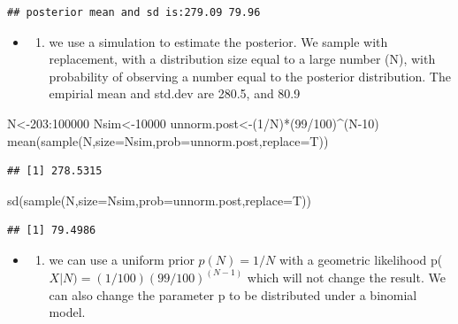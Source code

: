 \documentclass[
]{book}
\newenvironment{Shaded}{\begin{snugshade}}{\end{snugshade}}
\newcommand{\AttributeTok}[1]{\textcolor[rgb]{0.77,0.63,0.00}{#1}}
\newcommand{\DecValTok}[1]{\textcolor[rgb]{0.00,0.00,0.81}{#1}}
\newcommand{\FunctionTok}[1]{\textcolor[rgb]{0.00,0.00,0.00}{#1}}
\newcommand{\NormalTok}[1]{#1}
\newcommand{\OtherTok}[1]{\textcolor[rgb]{0.56,0.35,0.01}{#1}}
\newcommand{\SpecialCharTok}[1]{\textcolor[rgb]{0.00,0.00,0.00}{#1}}
\providecommand{\tightlist}{%
  \setlength{\itemsep}{0pt}\setlength{\parskip}{0pt}}
\theoremstyle{definition}
\theoremstyle{definition}
\theoremstyle{definition}
\theoremstyle{definition}
\theoremstyle{remark}
\begin{document}
\begin{verbatim}
## posterior mean and sd is:279.09 79.96
\end{verbatim}

\begin{itemize}
\item
  \begin{enumerate}
  \def\labelenumi{(\alph{enumi})}
  \setcounter{enumi}{1}
  \tightlist
  \item
    we use a simulation to estimate the posterior. We sample with replacement, with a distribution size equal to a large number (N), with probability of observing a number equal to the posterior distribution. The empirial mean and std.dev are 280.5, and 80.9
  \end{enumerate}
\end{itemize}

\begin{Shaded}
\begin{Highlighting}[]
\NormalTok{ N}\OtherTok{\textless{}{-}}\DecValTok{203}\SpecialCharTok{:}\DecValTok{100000}
\NormalTok{ Nsim}\OtherTok{\textless{}{-}}\DecValTok{10000}
\NormalTok{ unnorm.post}\OtherTok{\textless{}{-}}\NormalTok{(}\DecValTok{1}\SpecialCharTok{/}\NormalTok{N)}\SpecialCharTok{*}\NormalTok{(}\DecValTok{99}\SpecialCharTok{/}\DecValTok{100}\NormalTok{)}\SpecialCharTok{\^{}}\NormalTok{(N}\DecValTok{{-}10}\NormalTok{)}
 \FunctionTok{mean}\NormalTok{(}\FunctionTok{sample}\NormalTok{(N,}\AttributeTok{size=}\NormalTok{Nsim,}\AttributeTok{prob=}\NormalTok{unnorm.post,}\AttributeTok{replace=}\NormalTok{T))}
\end{Highlighting}
\end{Shaded}

\begin{verbatim}
## [1] 278.5315
\end{verbatim}

\begin{Shaded}
\begin{Highlighting}[]
 \FunctionTok{sd}\NormalTok{(}\FunctionTok{sample}\NormalTok{(N,}\AttributeTok{size=}\NormalTok{Nsim,}\AttributeTok{prob=}\NormalTok{unnorm.post,}\AttributeTok{replace=}\NormalTok{T))}
\end{Highlighting}
\end{Shaded}

\begin{verbatim}
## [1] 79.4986
\end{verbatim}

\begin{itemize}
\item
  \begin{enumerate}
  \def\labelenumi{(\alph{enumi})}
  \setcounter{enumi}{2}
  \tightlist
  \item
    we can use a uniform prior \(p(N) = 1/N\) with a geometric likelihood p(\(X|N)=(1/100)(99/100)^(N-1)\) which will not change the result. We can also change the parameter p to be distributed under a binomial model.
  \end{enumerate}
\end{itemize}
\end{document}
